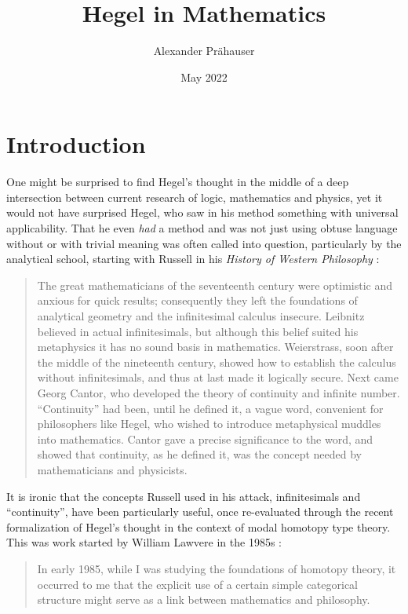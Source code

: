 \documentclass{article}
\title{Hegel in Mathematics}
\author{Alexander Prähauser}
\date{May 2022}
\begin{document}
\maketitle

\tableofcontents

\section{Introduction}
One might be surprised to find Hegel's thought in the middle of a deep intersection between current research
of logic, mathematics and physics, yet it would not have surprised Hegel, who saw in his method something
with universal applicability. That he even \emph{had} a method and was not just using obtuse language
without or with trivial meaning was often called into question, particularly by the analytical school,
starting with Russell in his \emph{History of Western Philosophy} \cite{Russ}:

\begin{quote}
    The great mathematicians of the seventeenth century were optimistic and anxious for quick results;
consequently they left the foundations of analytical geometry and the infinitesimal calculus insecure.
Leibnitz believed in actual infinitesimals, but although this belief suited his metaphysics it has no
sound basis in mathematics. Weierstrass, soon after the middle of the nineteenth century, showed how to
establish the calculus without infinitesimals, and thus at last made it logically secure. Next came Georg
Cantor, who developed the theory of continuity and infinite number. ``Continuity'' had been, until he
defined it, a vague word, convenient for philosophers like Hegel, who wished to introduce metaphysical
muddles into mathematics. Cantor gave a precise significance to the word, and showed that continuity,
as he defined it, was the concept needed by mathematicians and physicists.
\end{quote}

It is ironic that the concepts Russell used in his attack, infinitesimals and ``continuity'', have been
particularly useful, once re-evaluated through the recent formalization of Hegel's thought in the context
of modal homotopy type theory. This was work started by William Lawvere in the 1985s \cite{Law96}:

\begin{quote}
    In early 1985, while I was studying the foundations of homotopy theory, it occurred to me that the
explicit use of a certain simple categorical structure might serve as a link between mathematics and philosophy.

\end{quote}
\end{document}
